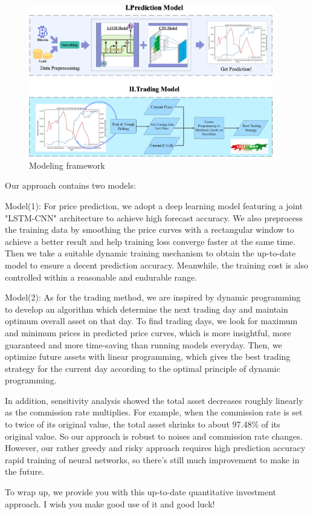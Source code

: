 \documentclass{mcmthesis}
\begin{document}
\begin{memo}[Memorandum]
\begin{figure}[htb]
    \centering
    \includegraphics[width = 0.95\textwidth]{fig/model framework.png}  %
    \caption{Modeling framework}
    \label{fig:to trader2}
\end{figure}

Our approach contains two models:


Model(1): For price prediction, we adopt a deep learning model featuring a joint "LSTM-CNN" architecture to achieve high forecast accuracy. We also preprocess the training data by smoothing the price curves with a rectangular window to achieve a better result and help training loss converge faster at the same time. Then we take a suitable dynamic training mechanism to obtain the up-to-date model to ensure a decent prediction accuracy. Meanwhile, the training cost is also controlled within a reasonable and endurable range. 



Model(2): As for the trading method, we are inspired by dynamic programming to develop an algorithm which determine the next trading day and maintain optimum overall asset on that day. To find trading days, we look for maximum and minimum prices in predicted price curves, which is more insightful, more guaranteed and more time-saving than running models everyday. Then, we optimize future assets with linear programming, which gives the best trading strategy for the current day according to the optimal principle of dynamic programming.


In addition, sensitivity analysis showed the total asset decreases roughly linearly as the commission rate multiplies. For example, when the commission rate is set to twice of its original value, the total asset shrinks to about 97.48\% of its original value. So our approach is robust to noises and commission rate changes. However, our rather greedy and risky approach requires high prediction accuracy rapid training of neural networks, so there's still much improvement to make in the future.


To wrap up, we provide you with this up-to-date quantitative investment approach. I wish you make good use of it and good luck!

\end{memo}
\end{document}

